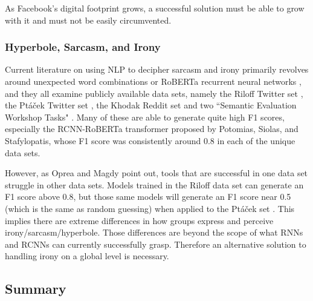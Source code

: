 \documentclass[preprint,review,12pt]{elsarticle}
\begin{document}
As Facebook's digital footprint grows, a successful solution must be able to grow with it and must not be easily circumvented. 

\subsubsection{Hyperbole, Sarcasm, and Irony}
\label{hyperbole}
Current literature on using NLP to decipher sarcasm and irony primarily revolves around unexpected word combinations \cite{barbieri2014modelling,buschmeier2014impact,ghosh2015sarcastic} or RoBERTa recurrent neural networks \cite{potamias2020transformer}, and they all examine publicly available data sets, namely the Riloff Twitter set \cite{riloff2013sarcasm}, the Pt{\'a}{\v{c}}ek Twitter set \cite{ptavcek2014sarcasm}, the Khodak Reddit set \cite{khodak2017large} and two ``Semantic Evaluation Workshop Tasks" \cite{van2018semeval,ghosh2015semeval}. Many of these are able to generate quite high F1 scores, especially the RCNN-RoBERTa transformer proposed by Potomias, Siolas, and Stafylopatis, whose F1 score was consistently around 0.8 in each of the unique data sets. 

However, as Oprea and Magdy point out, tools that are successful in one data set struggle in other data sets. Models trained in the Riloff data set can generate an F1 score above 0.8, but those same models will generate an F1 score near 0.5 (which is the same as random guessing) when applied to the Pt{\'a}{\v{c}}ek set \cite{oprea2019exploring}. This implies there are extreme differences in how groups express and perceive irony/sarcasm/hyperbole. Those differences are beyond the scope of what RNNs and RCNNs can currently successfully grasp. Therefore an alternative solution to handling irony on a global level is necessary. 
\subsection{Summary}
\label{truthvalueappendixsummary}
\end{document}
